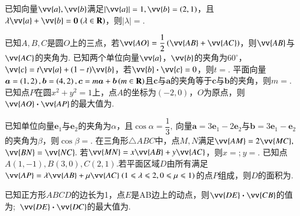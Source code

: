 \documentclass{BHCexam}
\newcommand{\xl}[2]{\vv{#1}\bm\cdot\vv{#2}}
\begin{document}
\begin{questions}
\vspace{-2em}
\begin{center}
\end{center}
\qs
已知向量$ \vv{a},\vv{b} $满足$ |\vv{a} |=1,\vv{b}=(2,1)$，且$ \lambda \vv{a}+\vv{b}=\bm{0}~(\lambda\in\mathbf{R}) $，则$ |\lambda |= $\tk.


\question
已知$A,B,C$是圆$O$上的三点，若$\vv{AO}=\dfrac{1}{2}\left(\vv{AB}+\vv{AC}\right)$，则$\vv{AB}$与$\vv{AC}$的夹角为\tk.
\qs 已知两个单位向量$\vv{a}$，$\vv{b}$的夹角为$60^{\circ}$，$\vv{c}=t\vv{a}+(1-t)\vv{b}$，若$\xl{b}{c}=0$，则$t=$\tk.
\qs 平面向量$\bm{a}=\left(1,2\right),\bm{b}=\left(4,2\right),\bm{c}=m\bm{a}+\bm{b}\left(m\in\mathbf{R}\right) $且$\bm{c} $与$ \bm{a} $的夹角等于$ \bm{c} $与$ \bm{b} $的夹角，则$ m= $\tk.
\qs 已知点$ P $在圆$ x^2+y^2=1 $上，点$ A $的坐标为$ (-2,0) $，$ O $为原点，则$ \vv{AO}\bm{\cdot}\vv{AP} $的最大值为\tk.

\qs 已知单位向量$ \bm{e}_1\text{与}\bm{e}_2 $的夹角为$ \alpha $，且$ \cos \alpha =\dfrac{1}{3},~$向量$ \bm{a}=3\bm{e}_1-2\bm{e}_2 $与$ \bm{b}=3\bm{e}_1-\bm{e}_2 $的夹角为$ \beta $，则$ \cos \beta =$\tk.
\qs 在三角形$\triangle ABC$中，点$ M,N $满足$ \vv{AM}=2\vv{MC} ,~$$ \vv{BN}=\vv{NC} .~$若$ \vv{MN}=x\vv{AB}+y\vv{AC} $，则$ x= $\tk;$~ y= $\tk.
\qs 已知点$ A(1,-1) ,B(3,0),C(2,1).$若平面区域$ D $由所有满足$ \vv{AP}=\lambda \vv{AB}+\mu \vv{AC}~(1\le \lambda \le 2,0\le \mu \le 1) $的点$ P $组成，则$ D $的面积为\tk.

\qs 已知正方形$ ABCD $的边长为1，点$ E $是AB边上的动点，则$ \vv{DE}\bm{\cdot} \vv{CB} $的值为\tk;~$ \vv{DE}\bm\cdot \vv{DC} $的最大值为\tk.


\end{questions}
\end{document}
